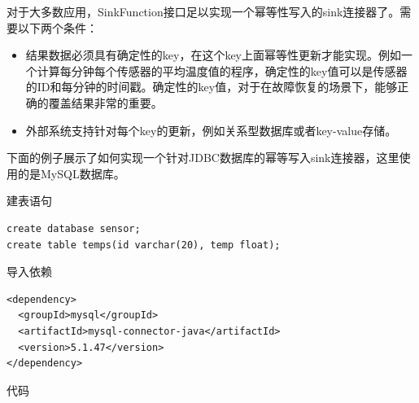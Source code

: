 \documentclass[cn,11pt,chinese]{elegantbook}
\begin{document}
对于大多数应用，SinkFunction接口足以实现一个幂等性写入的sink连接器了。需要以下两个条件：

\begin{itemize}
    \item 结果数据必须具有确定性的key，在这个key上面幂等性更新才能实现。例如一个计算每分钟每个传感器的平均温度值的程序，确定性的key值可以是传感器的ID和每分钟的时间戳。确定性的key值，对于在故障恢复的场景下，能够正确的覆盖结果非常的重要。
    \item 外部系统支持针对每个key的更新，例如关系型数据库或者key-value存储。
\end{itemize}

下面的例子展示了如何实现一个针对JDBC数据库的幂等写入sink连接器，这里使用的是MySQL数据库。

建表语句

\begin{verbatim}
create database sensor;
create table temps(id varchar(20), temp float);
\end{verbatim}

导入依赖

\begin{verbatim}
<dependency>
  <groupId>mysql</groupId>
  <artifactId>mysql-connector-java</artifactId>
  <version>5.1.47</version>
</dependency>
\end{verbatim}

代码
\end{document}
